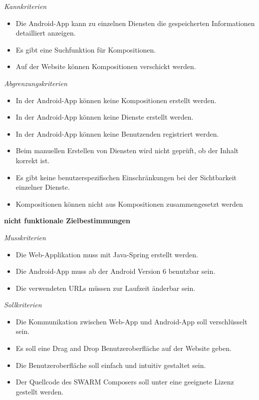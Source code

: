\textit{Kannkriterien}

\begin{itemize}[leftmargin=4pc]
	\item Die Android-App kann zu einzelnen Diensten die gespeicherten Informationen detailliert anzeigen.
	\item Es gibt eine Suchfunktion für Kompositionen.
	\item Auf der Website können Kompositionen verschickt werden.
\end{itemize}

\textit{Abgrenzungskriterien}

\begin{itemize}[leftmargin=4pc]
	\item In der Android-App können keine Kompositionen erstellt werden.
	\item In der Android-App können keine Dienste erstellt werden.
	\item In der Android-App können keine Benutzenden registriert werden.
	\item Beim manuellen Erstellen von Diensten wird nicht geprüft, ob der Inhalt korrekt ist.
	\item Es gibt keine benutzerspezifischen Einschränkungen bei der Sichtbarkeit einzelner Dienste.
	\item Kompositionen können nicht aus Kompositionen zusammengesetzt werden
\end{itemize}


\textbf{nicht funktionale Zielbestimmungen}\newline

\textit{Musskriterien}

\begin{itemize}[leftmargin=4pc]
	\item Die Web-Applikation muss mit Java-Spring erstellt werden.
	\item Die Android-App muss ab der Android Version 6 benutzbar sein.
	\item Die verwendeten URLs müssen zur Laufzeit änderbar sein.
\end{itemize}

\textit{Sollkriterien}

\begin{itemize}[leftmargin=4pc]
	\item Die Kommunikation zwischen Web-App und Android-App soll verschlüsselt sein.
	\item Es soll eine Drag and Drop Benutzeroberfläche auf der Website geben.
	\item Die Benutzeroberfläche soll einfach und intuitiv gestaltet sein.
	\item Der Quellcode des SWARM Composers soll unter eine geeignete Lizenz gestellt werden.
\end{itemize}

